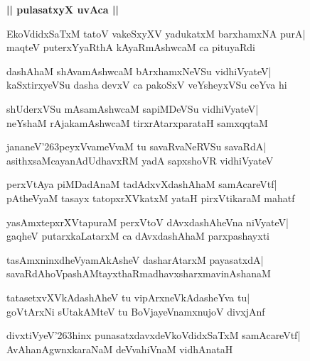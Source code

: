 \documentclass[twoside,12pt,openright]{book}
\def\S{\char'263}
\newcounter{shloka}[chapter]
\def\uvaca#1{\centerline{{\large\textbf{#1}}}}
\begin{document}
\uvaca{|| pulasatxyX uvAca ||}

\begin{shloka}%
EkoVdidxSaTxM tatoV vakeSxyXV yadukatxM barxhamxNA purA|\\
maqteV puterxYyaRthA kAyaRmAshwcaM ca pituyaRdi
\end{shloka}

\begin{shloka}%
dashAhaM shAvamAshwcaM bArxhamxNeVSu vidhiVyateV|\\
kaSxtirxyeVSu dasha devxV ca pakoSxV veYsheyxVSu ceYva hi
\end{shloka}

\begin{shloka}%
shUderxVSu mAsamAshwcaM sapiMDeVSu vidhiVyateV|\\
neYshaM rAjakamAshwcaM tirxrAtarxparataH samxqqtaM
\end{shloka}

\begin{shloka}%
jananeV\S peyxVvameVvaM tu savaRvaNeRVSu savaRdA|\\
asithxsaMcayanAdUdhavxRM yadA sapxshoVR vidhiVyateV
\end{shloka}

\begin{shloka}%
perxVtAya piMDadAnaM tadAdxvXdashAhaM samAcareVtf|\\
pAtheVyaM tasayx tatopxrXVkatxM yataH pirxVtikaraM mahatf
\end{shloka}

\begin{shloka}%
yasAmxtepxrXVtapuraM perxVtoV dAvxdashAheVna niVyateV|\\
gaqheV putarxkaLatarxM ca dAvxdashAhaM parxpashayxti
\end{shloka}

\begin{shloka}%
tasAmxninxdheVyamAkAsheV dasharAtarxM payasatxdA|\\
savaRdAhoVpashAMtayxthaRmadhavxsharxmavinAshanaM
\end{shloka}

\begin{shloka}%
tatasetxvXVkAdashAheV tu vipArxneVkAdasheYva tu|\\
goVtArxNi sUtakAMteV tu BoVjayeVnamxnujoV divxjAnf
\end{shloka}

\begin{shloka}%
divxtiVyeV\S hinx punasatxdavxdeVkoVdidxSaTxM samAcareVtf|\\
AvAhanAgwnxkaraNaM deVvahiVnaM vidhAnataH
\end{shloka}
\end{document}
